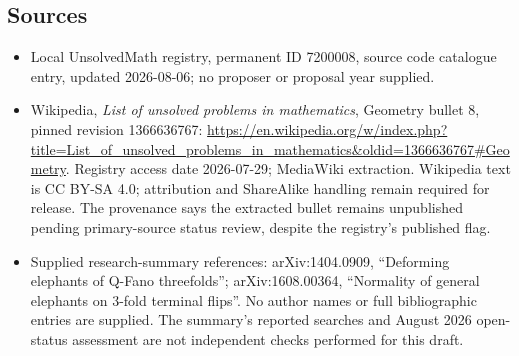 \documentclass[11pt]{article}
\begin{document}
\subsection{Sources}
\begin{itemize}
\item Local UnsolvedMath registry, permanent ID 7200008, source code catalogue entry, updated 2026-08-06; no proposer or proposal year supplied.
\item Wikipedia, \emph{List of unsolved problems in mathematics}, Geometry bullet 8, pinned revision 1366636767: \url{https://en.wikipedia.org/w/index.php?title=List_of_unsolved_problems_in_mathematics&oldid=1366636767#Geometry}. Registry access date 2026-07-29; MediaWiki extraction. Wikipedia text is CC BY-SA 4.0; attribution and ShareAlike handling remain required for release. The provenance says the extracted bullet remains unpublished pending primary-source status review, despite the registry's published flag.
\item Supplied research-summary references: arXiv:1404.0909, ``Deforming elephants of Q-Fano threefolds''; arXiv:1608.00364, ``Normality of general elephants on 3-fold terminal flips''. No author names or full bibliographic entries are supplied. The summary's reported searches and August 2026 open-status assessment are not independent checks performed for this draft.
\end{itemize}
\end{document}

